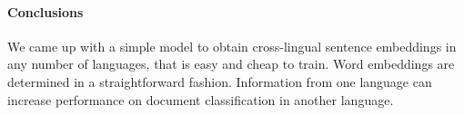 \documentclass[a4paper,11pt]{article}
\begin{document}




\paragraph{Conclusions}


We came up with a simple model to obtain cross-lingual sentence embeddings in any number of languages, that is easy and cheap to train. Word embeddings are determined in a straightforward fashion. Information from one language can increase performance on document classification in another language. 













\end{document}

